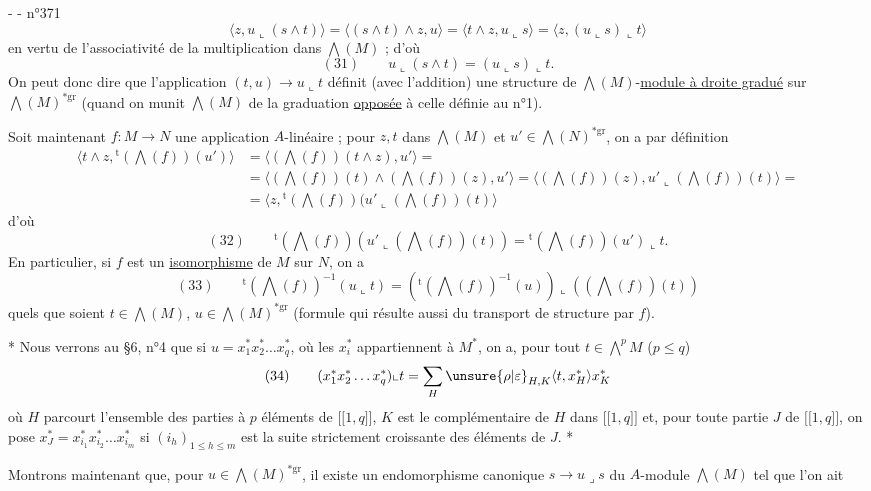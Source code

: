 -  -
\hfill n°371
\[
\langle z,u\llcorner(s\wedge t)\rangle=\langle(s\wedge t)\wedge z,u\rangle=\langle t\wedge z,u\llcorner s\rangle=\langle z,(u\llcorner s)\llcorner t\rangle
\]
en vertu de l'associativité de la multiplication dans $\bigwedge(M)$ ; d'où
\[
(31)\qquad u\llcorner(s\wedge t)=(u\llcorner s)\llcorner t.
\]
On peut donc dire que l'application $(t,u)\longrightarrow u\llcorner t$ définit (avec l'addition) une structure de $\bigwedge(M)$-\uline{module à droite gradué} sur $\bigwedge(M)^{*\mathrm{gr}}$ (quand on munit $\bigwedge(M)$ de la graduation \uline{opposée} à celle définie au n°1).

Soit maintenant $f:M\longrightarrow N$ une application $A$-linéaire ; pour $z,t$ dans $\bigwedge(M)$ et $u'\in\bigwedge(N)^{*\mathrm{gr}}$, on a par définition
\[
\begin{aligned}
\langle t\wedge z,{}^{\mathrm t}(\bigwedge(f))(u')\rangle&=\langle(\bigwedge(f))(t\wedge z),u'\rangle=\\
&=\langle(\bigwedge(f))(t)\wedge(\bigwedge(f))(z),u'\rangle=\langle(\bigwedge(f))(z),u'\llcorner(\bigwedge(f))(t)\rangle=\\
&=\langle z,{}^{\mathrm t}(\bigwedge(f))(u'\llcorner(\bigwedge(f))(t)\rangle
\end{aligned}
\]
d'où
\[
(32)\qquad{}^{\mathrm t}(\bigwedge(f))(u'\llcorner(\bigwedge(f))(t))={}^{\mathrm t}(\bigwedge(f))(u')\llcorner t.
\]
En particulier, si $f$ est un \uline{isomorphisme} de $M$ sur $N$, on a
\[
(33)\qquad{}^{\mathrm t}(\bigwedge(f))^{-1}(u\llcorner t)=({}^{\mathrm t}(\bigwedge(f))^{-1}(u))\llcorner((\bigwedge(f))(t))
\]
quels que soient $t\in\bigwedge(M)$, $u\in\bigwedge(M)^{*\mathrm{gr}}$ (formule qui résulte aussi du transport de structure par $f$).

* Nous verrons au §6, n°4 que si $u=x_1^*x_2^*\ldots x_q^*$, où les $x_i^*$ appartiennent à $M^*$, on a, pour tout $t\in\bigwedge^pM$ ($p\leq q$)
\[
(34)\qquad(x_1^*x_2^*\ldots x_q^*)\llcorner t=\sum_H\unsure{\rho|\varepsilon}_{H,K}\langle t,x_H^*\rangle x_K^*
\]
où $H$ parcourt l'ensemble des parties à $p$ éléments de $\lbrack\!\lbrack1,q\rbrack\!\rbrack$, $K$ est le complémentaire de $H$ dans $\lbrack\!\lbrack1,q\rbrack\!\rbrack$ et, pour toute partie $J$ de $\lbrack\!\lbrack1,q\rbrack\!\rbrack$, on pose $x_J^*=x_{i_1}^*x_{i_2}^*\ldots x_{i_m}^*$ si $(i_h)_{1\leq h\leq m}$ est la suite strictement croissante des éléments de $J$. *

Montrons maintenant que, pour $u\in\bigwedge(M)^{*\mathrm{gr}}$, il existe un endomorphisme canonique $s\longrightarrow u\lrcorner s$ du $A$-module $\bigwedge(M)$ tel que l'on ait
